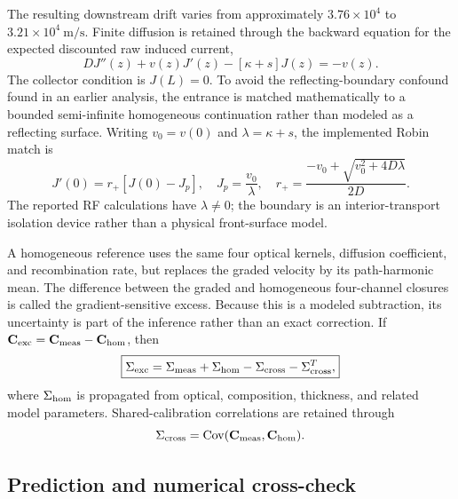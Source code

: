 \documentclass[11pt]{article}
\begin{document}
The resulting downstream drift varies from approximately $3.76\times10^4$ to $3.21\times10^4\ \mathrm{m/s}$. Finite diffusion is retained through the backward equation for the expected discounted raw induced current,
\begin{equation}
\boxed{
D J''(z)+v(z)J'(z)-[\kappa+s]J(z)=-v(z).}
\label{eq:hgbvp}
\end{equation}
The collector condition is $J(L)=0$. To avoid the reflecting-boundary confound found in an earlier analysis, the entrance is matched mathematically to a bounded semi-infinite homogeneous continuation rather than modeled as a reflecting surface. Writing $v_0=v(0)$ and $\lambda=\kappa+s$, the implemented Robin match is
\begin{equation}
\boxed{J'(0)=r_+[J(0)-J_p],\quad J_p=\frac{v_0}{\lambda},\quad r_+=\frac{-v_0+\sqrt{v_0^2+4D\lambda}}{2D}.}
\label{eq:hg_robin}
\end{equation}
The reported RF calculations have $\lambda\neq0$; the boundary is an interior-transport isolation device rather than a physical front-surface model.

A homogeneous reference uses the same four optical kernels, diffusion coefficient, and recombination rate, but replaces the graded velocity by its path-harmonic mean. The difference between the graded and homogeneous four-channel closures is called the gradient-sensitive excess. Because this is a modeled subtraction, its uncertainty is part of the inference rather than an exact correction. If $\mathbf C_{\rm exc}=\mathbf C_{\rm meas}-\mathbf C_{\rm hom}$, then
\begin{equation}
\boxed{\Sigma_{\rm exc}=\Sigma_{\rm meas}+\Sigma_{\rm hom}-\Sigma_{\rm cross}-\Sigma_{\rm cross}^{T},}
\label{eq:baseline_covariance}
\end{equation}
where $\Sigma_{\rm hom}$ is propagated from optical, composition, thickness, and related model parameters. Shared-calibration correlations are retained through
\begin{equation}
\Sigma_{\rm cross}=\operatorname{Cov}(\mathbf C_{\rm meas},\mathbf C_{\rm hom}).
\end{equation}

\subsection{Prediction and numerical cross-check}
\end{document}
